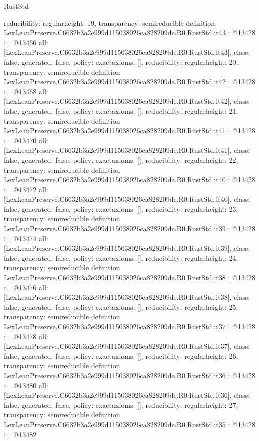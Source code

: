 \begin{lexlean}{RustStd}
\begin{coremodule}
{  reducibility: regular{height: 19},
  transparency: semireducible
}
definition LexLeanPreserve.C6632b3a2e999d115038026ca828209de.R0.RustStd.it43 : @13428 := @13466 {
  all: [LexLeanPreserve.C6632b3a2e999d115038026ca828209de.R0.RustStd.it43],
  class: false,
  generated: false,
  policy: exact{axioms: []},
  reducibility: regular{height: 20},
  transparency: semireducible
}
definition LexLeanPreserve.C6632b3a2e999d115038026ca828209de.R0.RustStd.it42 : @13428 := @13468 {
  all: [LexLeanPreserve.C6632b3a2e999d115038026ca828209de.R0.RustStd.it42],
  class: false,
  generated: false,
  policy: exact{axioms: []},
  reducibility: regular{height: 21},
  transparency: semireducible
}
definition LexLeanPreserve.C6632b3a2e999d115038026ca828209de.R0.RustStd.it41 : @13428 := @13470 {
  all: [LexLeanPreserve.C6632b3a2e999d115038026ca828209de.R0.RustStd.it41],
  class: false,
  generated: false,
  policy: exact{axioms: []},
  reducibility: regular{height: 22},
  transparency: semireducible
}
definition LexLeanPreserve.C6632b3a2e999d115038026ca828209de.R0.RustStd.it40 : @13428 := @13472 {
  all: [LexLeanPreserve.C6632b3a2e999d115038026ca828209de.R0.RustStd.it40],
  class: false,
  generated: false,
  policy: exact{axioms: []},
  reducibility: regular{height: 23},
  transparency: semireducible
}
definition LexLeanPreserve.C6632b3a2e999d115038026ca828209de.R0.RustStd.it39 : @13428 := @13474 {
  all: [LexLeanPreserve.C6632b3a2e999d115038026ca828209de.R0.RustStd.it39],
  class: false,
  generated: false,
  policy: exact{axioms: []},
  reducibility: regular{height: 24},
  transparency: semireducible
}
definition LexLeanPreserve.C6632b3a2e999d115038026ca828209de.R0.RustStd.it38 : @13428 := @13476 {
  all: [LexLeanPreserve.C6632b3a2e999d115038026ca828209de.R0.RustStd.it38],
  class: false,
  generated: false,
  policy: exact{axioms: []},
  reducibility: regular{height: 25},
  transparency: semireducible
}
definition LexLeanPreserve.C6632b3a2e999d115038026ca828209de.R0.RustStd.it37 : @13428 := @13478 {
  all: [LexLeanPreserve.C6632b3a2e999d115038026ca828209de.R0.RustStd.it37],
  class: false,
  generated: false,
  policy: exact{axioms: []},
  reducibility: regular{height: 26},
  transparency: semireducible
}
definition LexLeanPreserve.C6632b3a2e999d115038026ca828209de.R0.RustStd.it36 : @13428 := @13480 {
  all: [LexLeanPreserve.C6632b3a2e999d115038026ca828209de.R0.RustStd.it36],
  class: false,
  generated: false,
  policy: exact{axioms: []},
  reducibility: regular{height: 27},
  transparency: semireducible
}
definition LexLeanPreserve.C6632b3a2e999d115038026ca828209de.R0.RustStd.it35 : @13428 := @13482 {
}
\end{coremodule}
\end{lexlean}

